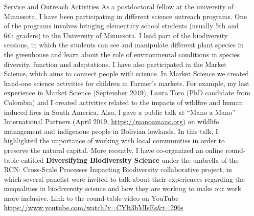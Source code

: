 \documentclass{resume} %
\begin{document}
\begin{rSection}{Service and Outreach Activities}
As a postdoctoral fellow at the university of Minnesota, I have been participating in different science outreach programs. One of the programs involves bringing elementary school students (usually 5th and 6th graders) to the University of Minnesota. I lead part of the biodiversity sessions, in which the students can see and manipulate different plant species in the greenhouse and learn about the role of environmental conditions in species diversity, function and adaptations. I have also participated in the Market Science, which aims to connect people with science. In Market Science we created hand-one science activities for children in Farmer’s markets. For example, my last experience in Market Science (September 2019), Laura Toro (PhD candidate from Colombia) and I created activities related to the impacts of wildfire and human induced fires in South America. Also, I gave a public talk at “Mano a Mano” International Partners (April 2019, \url{https://manoamano.org}) on wildlife management and indigenous people in Bolivian lowlands. In this talk, I highlighted the importance of working with local communities in order to preserve the natural capital. More recently, I have co-organized an online round-table entitled {\bf Diversifying Biodiversity Science} under the umbrella of the RCN: Cross-Scale Processes Impacting Biodiversity collaborative project, in which several panelist were invited to talk about their experiences regarding the inequalities in biodiversity science and how they are working to make our work more inclusive. Link to the round-table video on YouTube \url{https://www.youtube.com/watch?v=CYlt3bMIsEs&t=296s} 

\end{rSection}

\end{document}
